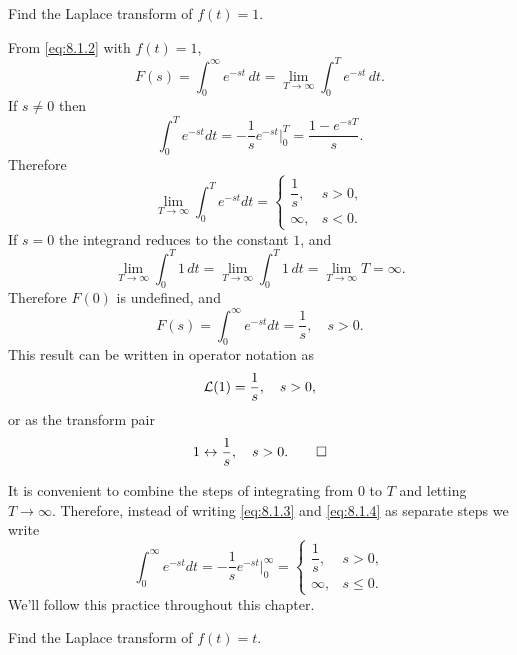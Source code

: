 
\begin{example}\label{example:8.1.1}
 Find the Laplace transform of  $f(t)=1$.
\end{example}

\begin{solution}
 From  \eqref{eq:8.1.2} with $f(t)=1$,
\[
F(s)=\int_0^\infty e^{-st}\,dt=\lim_{T\to\infty}\int_0^T e^{-st}\,
dt.
\]
If $s\ne 0$ then
\begin{equation}\label{eq:8.1.3}
\int_0^T e^{-st}dt=-\frac{1}{s}e^{-st}\Big|_0^T=\frac{1-e^{-sT}}{s}.
\end{equation}
Therefore
\begin{equation}\label{eq:8.1.4}
\lim_{T\to\infty}\int_0^T e^{-st}dt=\begin{cases}
\dfrac{1}{s}, &   s>0,\\
\infty, &  s<0.
\end{cases}
\end{equation}
If $s=0$  the integrand reduces to the constant $1$, and
\[
\lim_{T\to\infty}\int_0^T 1\,dt=\lim_{T\to\infty}\int_0^T 1\,dt=
\lim_{T\to\infty}T=\infty.
\]
Therefore $F(0)$ is undefined, and
\[
F(s)=\int_0^\infty e^{-st}dt=\frac{1}{s},\quad s>0.
\]
This result can be written in operator notation as
\[
{\mathcal L}(1)=\frac{1}{s},\quad s>0,
\]
or as the transform pair
\[
1\leftrightarrow\frac{1}{s},\quad s>0.\qedhere
\]
\end{solution}

\begin{remark*}
It is convenient to combine the steps of integrating from $0$ to $T$
and letting $T\to\infty$. Therefore, instead of writing \eqref{eq:8.1.3}
and \eqref{eq:8.1.4} as separate steps we write
\[
\int_0^\infty e^{-st}dt=- \frac{1}{s} e^{-st}\Big|_0^\infty=
\begin{cases}
\dfrac{1}{s}, & s>0,\\
\infty,&s\le0.
\end{cases}
\]
We'll follow this practice throughout this chapter.
\end{remark*}

\begin{example}\label{example:8.1.2}
 Find the Laplace transform of $f(t)=t$.
\end{example}

